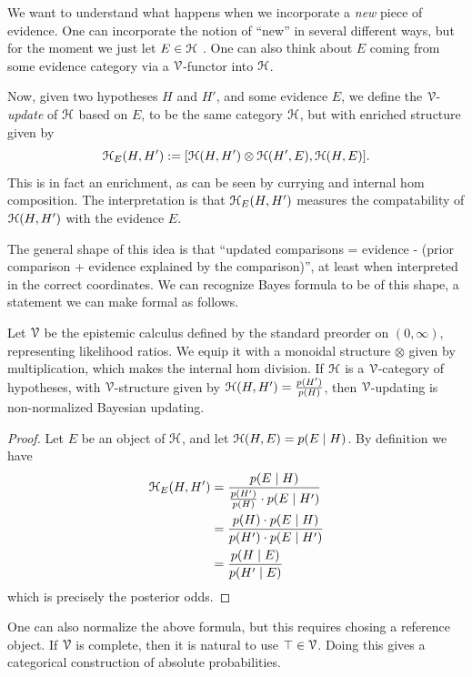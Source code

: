 We want to understand what happens when we incorporate a \emph{new} piece of evidence. One can incorporate the notion of ``new'' in several different ways, but for the moment we just let $E\in \EuScript{H}$ . One can also think about $E$ coming from some evidence category via a $\EuScript{V}$-functor into $\EuScript{H}$.  

Now, given two hypotheses $H$ and $H'$, and some evidence $E$, we define the $\EuScript{V}$-\emph{update} of $\EuScript{H}$ based on $E$, to be the same category $\EuScript{H}$, but with enriched structure given by 
\[\EuScript{H}_E(H,H') := [\EuScript{H}(H,H')\otimes \EuScript{H}(H',E), \EuScript{H}(H,E)].\]
This is in fact an enrichment, as can be seen by currying and internal hom composition. The interpretation is that $\EuScript{H}_E(H,H')$ measures the compatability of $\EuScript{H}(H,H')$ with the evidence $E$. 

The general shape of this idea is that ``updated comparisons = evidence - (prior comparison + evidence explained by the comparison)'', at least when interpreted in the correct coordinates. We can recognize Bayes formula to be of this shape, a statement we can make formal as follows. 

\begin{theorem}
    \label{thm:bayes-rule}
    Let $\EuScript{V}$ be the epistemic calculus defined by the standard preorder on $(0,\infty)$, representing likelihood ratios. We equip it with a monoidal structure $\otimes$ given by multiplication, which makes the internal hom division. If $\EuScript{H}$ is a $\EuScript{V}$-category of hypotheses, with $\EuScript{V}$-structure given by $\EuScript{H}(H, H')=\frac{p(H')}{p(H)}$, then $\EuScript{V}$-updating is non-normalized Bayesian updating. 
\end{theorem}
\begin{proof}
    Let $E$ be an object of $\EuScript{H}$, and let $\EuScript{H}(H, E) = p(E\mid H)$. By definition we have
    \begin{align*}
        \EuScript{H}_E(H,H') 
        &= \frac{p(E\mid H)}{\frac{p(H')}{p(H)}\cdot p(E\mid H')} \\
        &= \frac{p(H) \cdot p(E\mid H)}{p(H')\cdot p(E\mid H')} \\
        &= \frac{p(H\mid E)}{p(H'\mid E)}
    \end{align*}
    which is precisely the posterior odds. 
\end{proof}

One can also normalize the above formula, but this requires chosing a reference object. If $\EuScript{V}$ is complete, then it is natural to use $\top \in \EuScript{V}$. Doing this gives a categorical construction of absolute probabilities. 

